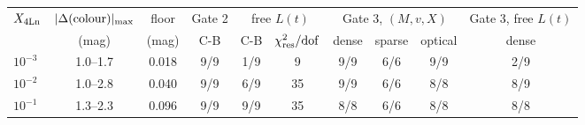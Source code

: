 \begin{tabular}{lccccccccc}
\toprule
$X_{\rm 4Ln}$ & $|\Delta({\rm colour})|_{\max}$ & floor & Gate 2 & \multicolumn{2}{c}{free $L(t)$} & \multicolumn{3}{c}{Gate 3, $(M,v,X)$} & Gate 3, free $L(t)$ \\
 & (mag) & (mag) & C-B & C-B & $\chi^2_{\rm res}/{\rm dof}$ & dense & sparse & optical & dense \\
\midrule
$10^{-3}$ & 1.0--1.7 & 0.018 & 9/9 & 1/9 & 9 & 9/9 & 6/6 & 9/9 & 2/9 \\
$10^{-2}$ & 1.0--2.8 & 0.040 & 9/9 & 6/9 & 35 & 9/9 & 6/6 & 8/8 & 8/9 \\
$10^{-1}$ & 1.3--2.3 & 0.096 & 9/9 & 9/9 & 35 & 8/8 & 6/6 & 8/8 & 8/8 \\
\bottomrule
\end{tabular}
